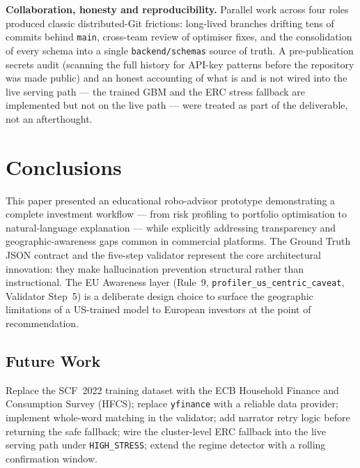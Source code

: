 \documentclass[11pt, a4paper]{article}
\begin{document}
\textbf{Collaboration, honesty and reproducibility.} Parallel work across four roles produced classic distributed-Git frictions: long-lived branches drifting tens of commits behind \texttt{main}, cross-team review of optimiser fixes, and the consolidation of every schema into a single \texttt{backend/schemas} source of truth. A pre-publication secrets audit (scanning the full history for API-key patterns before the repository was made public) and an honest accounting of what is and is not wired into the live serving path --- the trained GBM and the ERC stress fallback are implemented but not on the live path --- were treated as part of the deliverable, not an afterthought.

\section{Conclusions}

This paper presented an educational robo-advisor prototype demonstrating a complete investment workflow — from risk profiling to portfolio optimisation to natural-language explanation — while explicitly addressing transparency and geographic-awareness gaps common in commercial platforms. The Ground Truth JSON contract and the five-step validator represent the core architectural innovation: they make hallucination prevention structural rather than instructional. The EU Awareness layer (Rule~9, \texttt{profiler\_us\_centric\_caveat}, Validator Step~5) is a deliberate design choice to surface the geographic limitations of a US-trained model to European investors at the point of recommendation.

\subsection*{Future Work}
Replace the SCF~2022 training dataset with the ECB Household Finance and Consumption Survey (HFCS); replace \texttt{yfinance} with a reliable data provider; implement whole-word matching in the validator; add narrator retry logic before returning the safe fallback; wire the cluster-level ERC fallback into the live serving path under \texttt{HIGH\_STRESS}; extend the regime detector with a rolling confirmation window.

\nocite{FedSCF2022, MiFIDII}
\printbibliography
\end{document}
